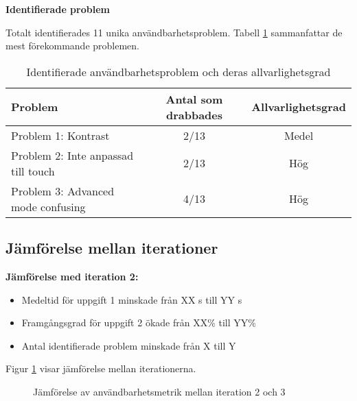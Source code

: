 \textbf{Identifierade problem}

Totalt identifierades 11 unika användbarhetsproblem. Tabell \ref{tab:problem3} sammanfattar de mest förekommande problemen.
\begin{table}[H]
\centering
\begin{tabular}{|p{6cm}|c|c|}
\hline
\textbf{Problem} & \textbf{Antal som drabbades} & \textbf{Allvarlighetsgrad} \\
\hline
Problem 1: Kontrast & 2/13 & Medel\\
Problem 2: Inte anpassad till touch& 2/13 &  Hög\\
Problem 3: Advanced mode confusing & 4/13 &  Hög\\
\hline
\end{tabular}
\caption{Identifierade användbarhetsproblem och deras allvarlighetsgrad}
\label{tab:problem3}
\end{table}

\subsection{Jämförelse mellan iterationer}
\textbf{Jämförelse med iteration 2:}

\begin{itemize}
    \item Medeltid för uppgift 1 minskade från XX s till YY s
    \item Framgångsgrad för uppgift 2 ökade från XX\% till YY\%
    \item Antal identifierade problem minskade från X till Y
\end{itemize}

Figur \ref{fig:comparison} visar jämförelse mellan iterationerna.

\begin{figure}[ht]
    \centering
    \caption{Jämförelse av användbarhetsmetrik mellan iteration 2 och 3}
    \label{fig:comparison}
\end{figure}
